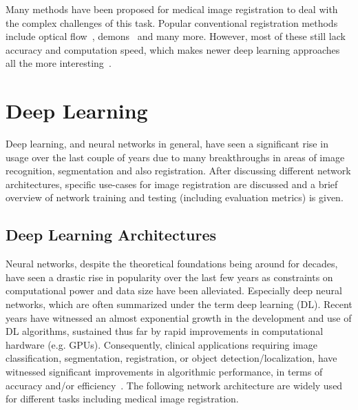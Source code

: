 Many methods have been proposed for medical image registration to deal with the complex challenges of this task. Popular conventional registration methods include optical flow~\cite{Yang2008}, demons~\cite{Vercauteren2009} and many more. However, most of these still lack accuracy and computation speed, which makes newer deep learning approaches all the more interesting~\cite{Fu2020}.


\section{Deep Learning} \label{Sec:DeepLearning}
Deep learning, and neural networks in general, have seen a significant rise in usage over the last couple of years due to many breakthroughs in areas of image recognition, segmentation and also registration. After discussing different network architectures, specific use-cases for image registration are discussed and a brief overview of network training and testing (including evaluation metrics) is given.

\subsection{Deep Learning Architectures} \label{SubSec:DeepLearningArchitectures}
Neural networks, despite the theoretical foundations being around for decades, have seen a drastic rise in popularity over the last few years as constraints on computational power and data size have been alleviated. Especially deep neural networks, which are often summarized under the term deep learning (DL). Recent years have witnessed an almost exponential growth in the development and use of DL algorithms, sustained thus far by rapid improvements in computational hardware (e.g. GPUs). Consequently, clinical applications requiring image classification, segmentation, registration, or object detection/localization, have witnessed significant improvements in algorithmic performance, in terms of accuracy and/or efficiency~\cite{Chen2020}. The following network architecture are widely used for different tasks including medical image registration.

